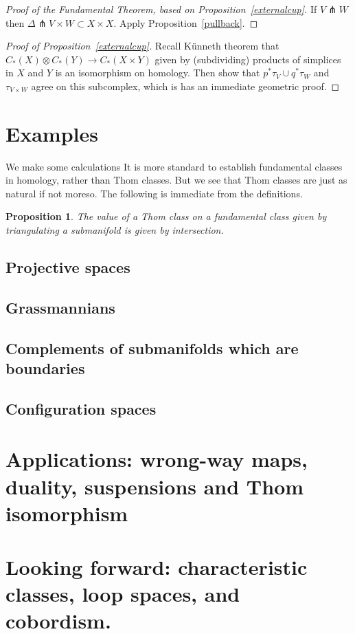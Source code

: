 \documentclass{amsart}          %
\newtheorem{proposition}[theorem]{Proposition}
\begin{document}
\begin{proof}[Proof of the Fundamental Theorem, based on Proposition~\ref{externalcup}]
If $V \pitchfork W$ then $\Delta \pitchfork V \times W \subset X \times X$.  Apply Proposition~\ref{pullback}.
\end{proof}

\begin{proof}[Proof of Proposition~\ref{externalcup}]
Recall K\"unneth theorem that  $C_*(X) \otimes C_*(Y) \to C_*(X \times Y)$ given by (subdividing) products of simplices in $X$ and $Y$ is an
isomorphism on homology.  Then show that $p^* \tau_V \cup q^* \tau_W$ and $\tau_{V \times W}$ agree on this subcomplex, which is has an immediate
geometric proof.
\end{proof}

\section{Examples}

We make some calculations 
It is more standard to establish fundamental classes in homology, rather than Thom classes.  But we see that Thom classes are just as natural if not moreso.
The following is immediate from the definitions.

\begin{proposition}
The value of a Thom class on  a fundamental class given by triangulating a submanifold is given by intersection.
\end{proposition}


\subsection{Projective spaces}

\subsection{Grassmannians}

\subsection{Complements of submanifolds which are boundaries}

\subsection{Configuration spaces}

\section{Applications: wrong-way maps, duality, suspensions and Thom isomorphism}

\section{Looking forward: characteristic classes, loop spaces, and cobordism.}
\end{document}
